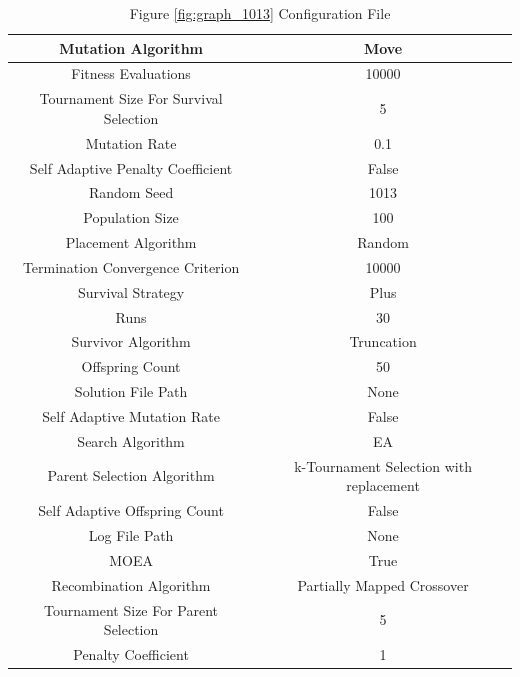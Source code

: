\documentclass{standalone}
\begin{document}
\begin{table}[!htb]
	\centering
	\caption{Figure \ref{fig:graph_1013} Configuration File}
	\label{tab:graph_1013}
	\begin{tabular}{| c | c |}
		\hline
		Mutation Algorithm		& Move		 \\
		\hline
		Fitness Evaluations		& 10000		 \\
		\hline
		Tournament Size For Survival Selection		& 5		 \\
		\hline
		Mutation Rate		& 0.1		 \\
		\hline
		Self Adaptive Penalty Coefficient		& False		 \\
		\hline
		Random Seed		& 1013		 \\
		\hline
		Population Size		& 100		 \\
		\hline
		Placement Algorithm		& Random		 \\
		\hline
		Termination Convergence Criterion		& 10000		 \\
		\hline
		Survival Strategy		& Plus		 \\
		\hline
		Runs		& 30		 \\
		\hline
		Survivor Algorithm		& Truncation		 \\
		\hline
		Offspring Count		& 50		 \\
		\hline
		Solution File Path		& None		 \\
		\hline
		Self Adaptive Mutation Rate		& False		 \\
		\hline
		Search Algorithm		& EA		 \\
		\hline
		Parent Selection Algorithm		& k-Tournament Selection with replacement		 \\
		\hline
		Self Adaptive Offspring Count		& False		 \\
		\hline
		Log File Path		& None		 \\
		\hline
		MOEA		& True		 \\
		\hline
		Recombination Algorithm		& Partially Mapped Crossover		 \\
		\hline
		Tournament Size For Parent Selection		& 5		 \\
		\hline
		Penalty Coefficient		& 1		 \\
		\hline
	\end{tabular}
\end{table}
\end{document}
